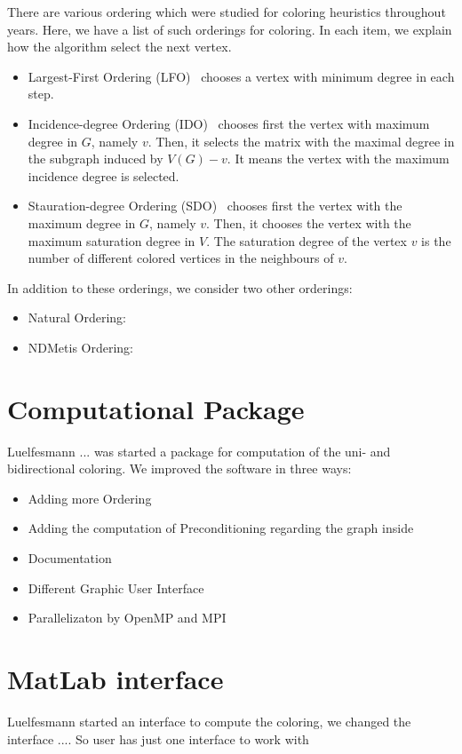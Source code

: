 \documentclass[12pt, oneside]{book}
\begin{document}
There are various ordering which were studied for coloring heuristics
throughout years. Here, we have a list of such orderings for coloring.
In each item, we explain how the algorithm select the next vertex.
\begin{itemize}
\item Largest-First Ordering (LFO)~\cite{LFO} chooses a vertex with minimum degree in each step.
\item Incidence-degree Ordering (IDO)~\cite{IDO} chooses first the vertex with maximum degree in $G$, namely $v$. Then, it selects the matrix with the maximal degree in the subgraph induced by $V(G)-v$. It means the vertex with the maximum incidence degree is selected.
\item Stauration-degree Ordering (SDO)~\cite{SDO} chooses first the vertex with the maximum degree in $G$, namely $v$. Then, it chooses the vertex with the maximum saturation degree in
$V$. The saturation degree of the vertex $v$ is the number of different colored vertices in the neighbours of $v$.
\end{itemize}
In addition to these orderings, we consider two other orderings:
\begin{itemize}
\item Natural Ordering:
\item NDMetis Ordering\cite{metis,par-nested-disection}:
\end{itemize}

\section{Computational Package}
Luelfesmann ... was started a package for computation of the uni- and bidirectional coloring.
We improved the software in three ways:
\begin{itemize}
\item Adding more Ordering
\item Adding the computation of Preconditioning regarding the graph inside
\item Documentation
\item Different Graphic User Interface
\item Parallelizaton by OpenMP and MPI
\end{itemize}

\section{MatLab interface}
Luelfesmann started an interface to compute the coloring,
we changed the interface .... So user has just one interface to work with
\end{document}
